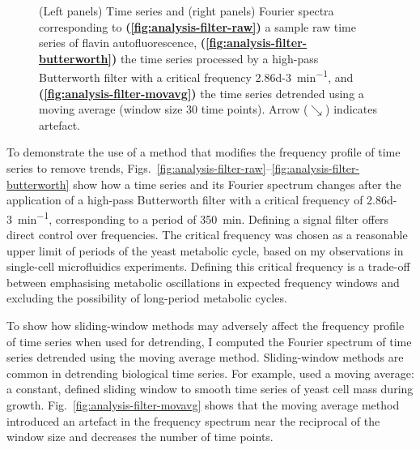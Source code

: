 \begin{figure}
  \caption[
    Time series and Fourier spectra corresponding to
    a sample raw time series of flavin autofluorescence,
    the time series processed by a high-pass Butterworth filter, and
    the time series detrended using a moving average.
  ]{
    (Left panels) Time series and (right panels) Fourier spectra corresponding to
    \textbf{(\ref{fig:analysis-filter-raw})}
    a sample raw time series of flavin autofluorescence,
    \textbf{(\ref{fig:analysis-filter-butterworth})}
    the time series processed by a high-pass Butterworth filter with a critical frequency \SI{2.86d-3}{\minute^{-1}}, and
    \textbf{(\ref{fig:analysis-filter-movavg})}
    the time series detrended using a moving average (window size 30 time points).
    Arrow ($\searrow$) indicates artefact.
  }
  \label{fig:analysis-filter}
\end{figure}

To demonstrate the use of a method that modifies the frequency profile of time series to remove trends, Figs.\ \ref{fig:analysis-filter-raw}--\ref{fig:analysis-filter-butterworth} show how a time series and its Fourier spectrum changes after the application of a high-pass Butterworth filter with a critical frequency of \SI{2.86d-3}{\minute^{-1}}, corresponding to a period of \SI{350}{\minute}.
Defining a signal filter offers direct control over frequencies.
The critical frequency was chosen as a reasonable upper limit of periods of the yeast metabolic cycle, based on my observations in single-cell microfluidics experiments.
Defining this critical frequency is a trade-off between emphasising metabolic oscillations in expected frequency windows and excluding the possibility of long-period metabolic cycles.

To show how sliding-window methods may adversely affect the frequency profile of time series when used for detrending, I computed the Fourier spectrum of time series detrended using the moving average method.
Sliding-window methods are common in detrending biological time series.
For example, \textcite{cunyHighresolutionMassMeasurements2022} used a moving average: a constant, defined sliding window to smooth time series of yeast cell mass during growth.
%
Fig.\ \ref{fig:analysis-filter-movavg} shows that the moving average method introduced an artefact in the frequency spectrum near the reciprocal of the window size and decreases the number of time points.



